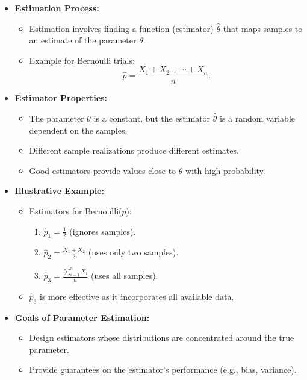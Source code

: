 \documentclass{article}
\begin{document}
\begin{itemize}
  \item \textbf{Estimation Process:}
    \begin{itemize}
      \item Estimation involves finding a function (estimator) $\hat{\theta}$ that maps samples to an estimate of the parameter $\theta$.
      \item Example for Bernoulli trials:
        \[
          \hat{p} = \frac{X_1 + X_2 + \cdots + X_n}{n}.
        \]
    \end{itemize}

  \item \textbf{Estimator Properties:}
    \begin{itemize}
      \item The parameter $\theta$ is a constant, but the estimator $\hat{\theta}$ is a random variable dependent on the samples.
      \item Different sample realizations produce different estimates.
      \item Good estimators provide values close to $\theta$ with high probability.
    \end{itemize}

  \item \textbf{Illustrative Example:}
    \begin{itemize}
      \item Estimators for Bernoulli($p$):
        \begin{enumerate}
          \item $\hat{p}_1 = \frac{1}{2}$ (ignores samples).
          \item $\hat{p}_2 = \frac{X_1 + X_2}{2}$ (uses only two samples).
          \item $\hat{p}_3 = \frac{\sum_{i=1}^n X_i}{n}$ (uses all samples).
        \end{enumerate}
      \item $\hat{p}_3$ is more effective as it incorporates all available data.
    \end{itemize}

  \item \textbf{Goals of Parameter Estimation:}
    \begin{itemize}
      \item Design estimators whose distributions are concentrated around the true parameter.
      \item Provide guarantees on the estimator's performance (e.g., bias, variance).
    \end{itemize}
\end{itemize}
\end{document}
